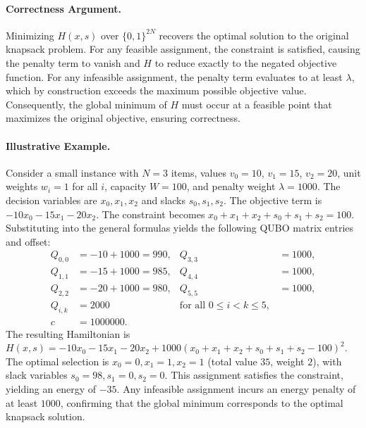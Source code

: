 \documentclass[12pt]{article}
\begin{document}
\paragraph{Correctness Argument.}
Minimizing $H(x,s)$ over $\{0,1\}^{2N}$ recovers the optimal solution to the original knapsack problem. For any feasible assignment, the constraint is satisfied, causing the penalty term to vanish and $H$ to reduce exactly to the negated objective function. For any infeasible assignment, the penalty term evaluates to at least $\lambda$, which by construction exceeds the maximum possible objective value. Consequently, the global minimum of $H$ must occur at a feasible point that maximizes the original objective, ensuring correctness.

\paragraph{Illustrative Example.}
Consider a small instance with $N=3$ items, values $v_0=10$, $v_1=15$, $v_2=20$, unit weights $w_i=1$ for all $i$, capacity $W=100$, and penalty weight $\lambda=1000$. The decision variables are $x_0, x_1, x_2$ and slacks $s_0, s_1, s_2$. The objective term is $-10x_0 - 15x_1 - 20x_2$. The constraint becomes $x_0 + x_1 + x_2 + s_0 + s_1 + s_2 = 100$. Substituting into the general formulas yields the following QUBO matrix entries and offset:
\begin{align}
Q_{0,0} &= -10 + 1000 = 990, & Q_{3,3} &= 1000, \\
Q_{1,1} &= -15 + 1000 = 985, & Q_{4,4} &= 1000, \\
Q_{2,2} &= -20 + 1000 = 980, & Q_{5,5} &= 1000, \\
Q_{i,k} &= 2000 & \text{for all } 0 \le i < k \le 5, \\
c &= 1000000.
\end{align}
The resulting Hamiltonian is $H(x,s) = -10x_0 - 15x_1 - 20x_2 + 1000(x_0 + x_1 + x_2 + s_0 + s_1 + s_2 - 100)^2$. The optimal selection is $x_0=0, x_1=1, x_2=1$ (total value $35$, weight $2$), with slack variables $s_0=98, s_1=0, s_2=0$. This assignment satisfies the constraint, yielding an energy of $-35$. Any infeasible assignment incurs an energy penalty of at least $1000$, confirming that the global minimum corresponds to the optimal knapsack solution.
\end{document}
